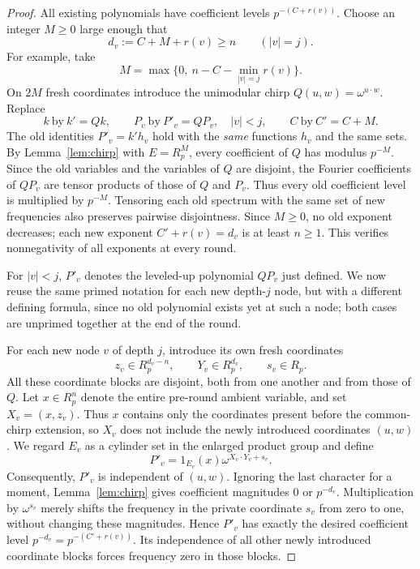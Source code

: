 \documentclass[10pt,a4paper]{amsart}
\newcommand{\R}{R}
\begin{document}
\begin{proof}
All existing polynomials have coefficient levels
\(p^{-(C+r(v))}\). Choose an integer \(M\geq0\) large enough that
\begin{equation}
 d_v:=C+M+r(v)\geq n\qquad (|v|=j).
\end{equation}
For example, take
\[
 M=\max\bigl\{0,\ n-C-\min_{|v|=j}r(v)\bigr\}.
\]
On \(2M\) fresh coordinates introduce the unimodular chirp
\(Q(u,w)=\omega^{u\cdot w}\). Replace
\[
 k\ \text{by}\ k'=Qk,\qquad
 P_v\ \text{by}\ P'_v=QP_v,\quad |v|<j,
 \qquad C\ \text{by}\ C'=C+M.
\]
The old identities \(P'_v=k'h_v\) hold with the \emph{same}
functions \(h_v\) and the same sets. By Lemma~\ref{lem:chirp} with
\(E=\R_p^M\), every coefficient of \(Q\) has modulus \(p^{-M}\).
Since the old variables and the variables of \(Q\) are disjoint,
the Fourier coefficients of \(QP_v\) are tensor products of those
of \(Q\) and \(P_v\). Thus every old coefficient level is multiplied
by \(p^{-M}\). Tensoring each old spectrum with the same set of new
frequencies also preserves pairwise disjointness.
Since \(M\geq0\), no old exponent decreases; each new exponent
\(C'+r(v)=d_v\) is at least \(n\geq1\).
This verifies nonnegativity of all exponents at every round.

For \(|v|<j\), \(P'_v\) denotes the leveled-up polynomial \(QP_v\)
just defined. We now reuse the same primed notation for each new
depth-\(j\) node, but with a different defining formula, since no
old polynomial exists yet at such a node; both cases are unprimed
together at the end of the round.

For each new node \(v\) of depth \(j\), introduce its own fresh
coordinates
\[
 z_v\in\R_p^{d_v-n},\qquad
 Y_v\in\R_p^{d_v},\qquad s_v\in\R_p.
\]
All these coordinate blocks are disjoint, both from one another
and from those of \(Q\). Let \(x\in\R_p^n\) denote the entire
pre-round ambient variable, and set \(X_v=(x,z_v)\). Thus \(x\)
contains only the coordinates present before the common-chirp extension,
so \(X_v\) does not include the newly introduced coordinates \((u,w)\).
 We regard \(E_v\)
as a cylinder set in the enlarged product group and define
\begin{equation}
 P'_v=1_{E_v}(x)\omega^{X_v\cdot Y_v+s_v}.
\end{equation}
Consequently, \(P'_v\) is independent of \((u,w)\).
Ignoring the last character for a moment, Lemma~\ref{lem:chirp}
gives coefficient magnitudes \(0\) or \(p^{-d_v}\). Multiplication by
\(\omega^{s_v}\) merely shifts the frequency in the private coordinate
\(s_v\) from zero to one, without changing these magnitudes. Hence
\(P'_v\) has exactly the desired coefficient level
\(p^{-d_v}=p^{-(C'+r(v))}\). Its independence of all other newly
introduced coordinate blocks forces frequency zero in those blocks.



\end{proof}
\end{document}
